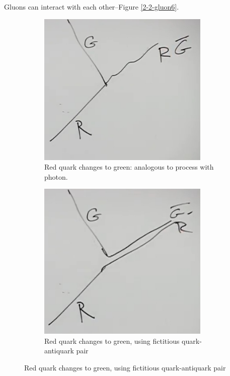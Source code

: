 \documentclass[]{article}
\begin{document}
Gluons can interact with each other--Figure \ref{2-2-gluon6}.
\begin{figure}[H]
	\caption{The basic vertices of QCD}
	\begin{subfigure}{0.45\textwidth}
		\caption{Red quark changes to green: analogous to process with photon.}
		\includegraphics[width=0.9\textwidth]{2-2-gluon3}
	\end{subfigure}
	\begin{subfigure}{0.45\textwidth}
		\caption{Red quark changes to green, using fictitious quark-antiquark pair}
		\includegraphics[width=0.9\textwidth]{2-2-gluon4}

\end{subfigure}
\end{figure}
\end{document}
